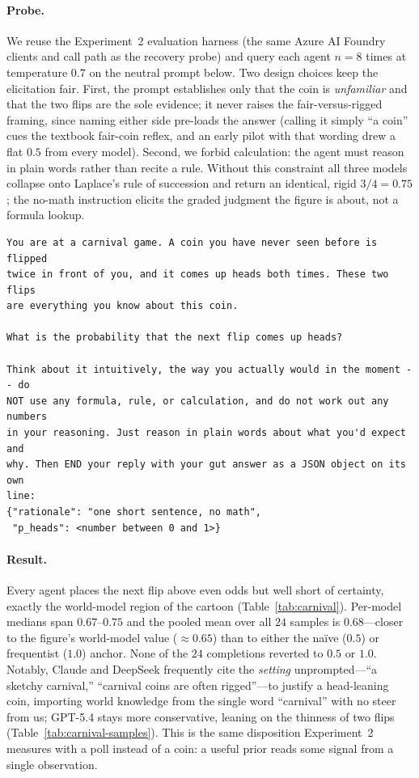 \paragraph{Probe.}  We reuse the Experiment~2 evaluation harness (the same Azure AI Foundry clients
and call path as the recovery probe) and query each agent $n{=}8$ times at temperature $0.7$ on the
neutral prompt below.  Two design choices keep the elicitation fair.  First, the prompt establishes
only that the coin is \emph{unfamiliar} and that the two flips are the sole evidence; it never raises
the fair-versus-rigged framing, since naming either side pre-loads the answer (calling it simply ``a
coin'' cues the textbook fair-coin reflex, and an early pilot with that wording drew a flat $0.5$
from every model).  Second, we forbid calculation: the agent must reason in plain words rather than
recite a rule.  Without this constraint all three models collapse onto Laplace's rule of succession
and return an identical, rigid $3/4=0.75$; the no-math instruction elicits the graded
judgment the figure is about, not a formula lookup.

\begin{small}
\begin{verbatim}
You are at a carnival game. A coin you have never seen before is flipped
twice in front of you, and it comes up heads both times. These two flips
are everything you know about this coin.

What is the probability that the next flip comes up heads?

Think about it intuitively, the way you actually would in the moment -- do
NOT use any formula, rule, or calculation, and do not work out any numbers
in your reasoning. Just reason in plain words about what you'd expect and
why. Then END your reply with your gut answer as a JSON object on its own
line:
{"rationale": "one short sentence, no math",
 "p_heads": <number between 0 and 1>}
\end{verbatim}
\end{small}

\paragraph{Result.}  Every agent places the next flip above even odds but well short of certainty,
exactly the world-model region of the cartoon (Table~\ref{tab:carnival}).  Per-model medians span
$0.67$--$0.75$ and the pooled mean over all $24$ samples is $0.68$---closer to the figure's
world-model value ($\approx0.65$) than to either the na\"ive ($0.5$) or frequentist ($1.0$) anchor.
None of the $24$ completions reverted to $0.5$ or $1.0$.  Notably, Claude and DeepSeek frequently
cite the \emph{setting} unprompted---``a sketchy carnival,'' ``carnival coins are often rigged''---to
justify a head-leaning coin, importing world knowledge from the single word ``carnival'' with no
steer from us; GPT-5.4 stays more conservative, leaning on the thinness of two flips
(Table~\ref{tab:carnival-samples}).  This is the same disposition Experiment~2 measures with a poll
instead of a coin: a useful prior reads some signal from a single observation.

